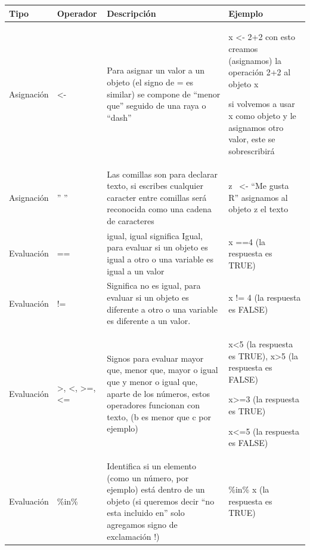 \documentclass[
  letterpaper,
  DIV=11,
  numbers=noendperiod]{scrreprt}
\begin{document}
\begin{longtable}[]{@{}
  >{\raggedright\arraybackslash}p{}
  >{\raggedright\arraybackslash}p{}
  >{\raggedright\arraybackslash}p{}
  >{\raggedright\arraybackslash}p{}@{}}
\toprule\noalign{}
\begin{minipage}[b]{\linewidth}\raggedright
Tipo
\end{minipage} & \begin{minipage}[b]{\linewidth}\raggedright
Operador
\end{minipage} & \begin{minipage}[b]{\linewidth}\raggedright
Descripción
\end{minipage} & \begin{minipage}[b]{\linewidth}\raggedright
Ejemplo
\end{minipage} \\
\midrule\noalign{}
\endhead
\bottomrule\noalign{}
\endlastfoot
Asignación & \textless- & Para asignar un valor a un objeto (el signo de
= es similar) se compone de ``menor que'' seguido de una raya o ``dash''
& x \textless- 2+2 con esto creamos (asignamos) la operación 2+2 al
objeto x

si volvemos a usar x como objeto y le asignamos otro valor, este se
sobrescribirá \\
Asignación & '' '' & Las comillas son para declarar texto, si escribes
cualquier caracter entre comillas será reconocida como una cadena de
caracteres & z~ \textless- ``Me gusta R'' asignamos al objeto z el
texto \\
Evaluación & == & igual, igual significa Igual, para evaluar si un
objeto es igual a otro o una variable es igual a un valor & x ==4 (la
respuesta es TRUE) \\
Evaluación & != & Significa no es igual, para evaluar si un objeto es
diferente a otro o una variable es diferente a un valor. & x != 4 (la
respuesta es FALSE) \\
Evaluación & \textgreater, \textless, \textgreater=, \textless= & Signos
para evaluar mayor que, menor que, mayor o igual que y menor o igual
que, aparte de los números, estos operadores funcionan con texto, (b es
menor que c por ejemplo) & x\textless5 (la respuesta es TRUE),
x\textgreater5 (la respuesta es FALSE)

x\textgreater=3 (la respuesta es TRUE)

x\textless=5 (la respuesta es FALSE) \\
Evaluación & \%in\% & Identifica si un elemento (como un número, por
ejemplo) está dentro de un objeto (si queremos decir ``no esta incluido
en'' solo agregamos signo de exclamación !) & 2 \%in\% x (la respuesta
es TRUE)


\end{longtable}
\end{document}

